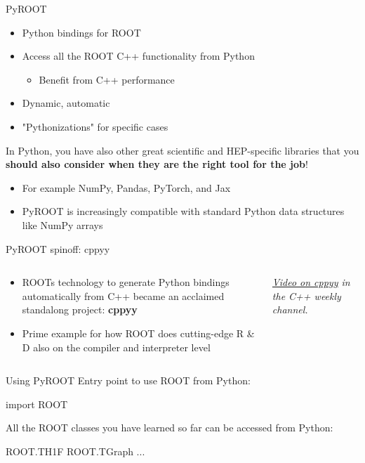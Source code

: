 \documentclass[aspectratio=169]{beamer}
\newcommand{\myfigure}[2]{
    \begin{figure}
        \makebox[\textwidth]{%
            \texttt{[image: \#2]}
        }
    \end{figure}
}
\newcommand{\myhref}[2]{{\color{blue}\href{#1}{\underline{#2}}}}
\begin{document}
\begin{frame}{PyROOT}
    \begin{itemize}
        \item Python bindings for ROOT
        \item Access all the ROOT C++ functionality from Python
              \begin{itemize} \item Benefit from C++ performance \end{itemize}
        \item Dynamic, automatic
        \item "Pythonizations" for specific cases
    \end{itemize}
    \vspace{5mm}
    In Python, you have also other great scientific and HEP-specific libraries that you \textbf{should also consider when they are the right tool for the job}!
    \begin{itemize}
        \item For example NumPy, Pandas, PyTorch, and Jax
        \item PyROOT is increasingly compatible with standard Python data structures like NumPy arrays
    \end{itemize}
\end{frame}

\begin{frame}{PyROOT spinoff: cppyy}
\begin{columns}
    \begin{column}{0.6\textwidth}
       \begin{itemize}
           \item{ROOTs technology to generate Python bindings automatically from C++ became an acclaimed standalong project: \textbf{cppyy}}
           \item{Prime example for how ROOT does cutting-edge R \& D also on the compiler and interpreter level}
       \end{itemize}
    \end{column}
    \begin{column}{0.4\textwidth}
        \myfigure{1.0}{cpp_weekly_cppyy.jpg}
        \textit{\myhref{https://www.youtube.com/watch?v=TL83P77vZ1k&t=153s}{Video on cppyy} in the C++ weekly channel.}
    \end{column}
\end{columns}
\end{frame}

\begin{frame}[fragile]{Using PyROOT}
    Entry point to use ROOT from Python:
    \begin{pycell}
        import ROOT
    \end{pycell}
    All the ROOT classes you have learned so far can be accessed from Python:
    \begin{pycell}
ROOT.TH1F
ROOT.TGraph
...
    \end{pycell}
\end{frame}
\end{document}
